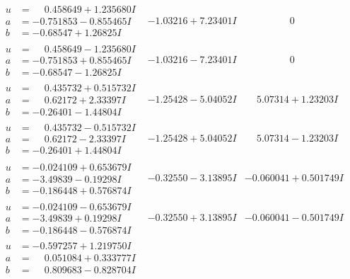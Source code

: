 \documentclass[1p]{elsarticle_modified}
\theoremstyle{definition}
\begin{document}
$$\begin{array}{c|c|c}
 \hline 
\begin{aligned}
u &= \phantom{-}0.458649 + 1.235680 I \\
a &= -0.751853 - 0.855465 I \\
b &= -0.68547 + 1.26825 I\end{aligned}
 & -1.03216 + 7.23401 I & \phantom{-0.000000 } 0 \\ \hline\begin{aligned}
u &= \phantom{-}0.458649 - 1.235680 I \\
a &= -0.751853 + 0.855465 I \\
b &= -0.68547 - 1.26825 I\end{aligned}
 & -1.03216 - 7.23401 I & \phantom{-0.000000 } 0 \\ \hline\begin{aligned}
u &= \phantom{-}0.435732 + 0.515732 I \\
a &= \phantom{-}0.62172 + 2.33397 I \\
b &= -0.26401 - 1.44804 I\end{aligned}
 & -1.25428 - 5.04052 I & \phantom{-}5.07314 + 1.23203 I \\ \hline\begin{aligned}
u &= \phantom{-}0.435732 - 0.515732 I \\
a &= \phantom{-}0.62172 - 2.33397 I \\
b &= -0.26401 + 1.44804 I\end{aligned}
 & -1.25428 + 5.04052 I & \phantom{-}5.07314 - 1.23203 I \\ \hline\begin{aligned}
u &= -0.024109 + 0.653679 I \\
a &= -3.49839 - 0.19298 I \\
b &= -0.186448 + 0.576874 I\end{aligned}
 & -0.32550 - 3.13895 I & -0.060041 + 0.501749 I \\ \hline\begin{aligned}
u &= -0.024109 - 0.653679 I \\
a &= -3.49839 + 0.19298 I \\
b &= -0.186448 - 0.576874 I\end{aligned}
 & -0.32550 + 3.13895 I & -0.060041 - 0.501749 I \\ \hline\begin{aligned}
u &= -0.597257 + 1.219750 I \\
a &= \phantom{-}0.051084 + 0.333777 I \\
b &= \phantom{-}0.809683 - 0.828704 I\end{aligned}

\end{array}$$
\end{document}
